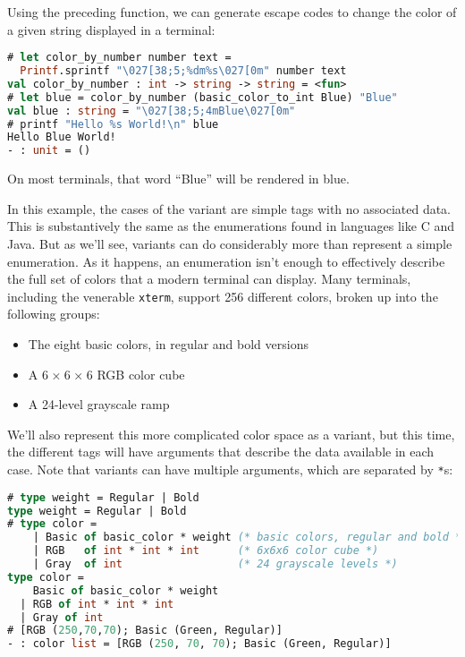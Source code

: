 Using the preceding function, we can generate escape codes to change the
color of a given string displayed in a terminal:

\begin{lstlisting}[language=Caml]
# let color_by_number number text =
  Printf.sprintf "\027[38;5;%dm%s\027[0m" number text
val color_by_number : int -> string -> string = <fun>
# let blue = color_by_number (basic_color_to_int Blue) "Blue"
val blue : string = "\027[38;5;4mBlue\027[0m"
# printf "Hello %s World!\n" blue
Hello Blue World!
- : unit = ()
\end{lstlisting}

On most terminals, that word ``Blue'' will be rendered in blue.

In this example, the cases of the variant are simple tags with no
associated data. This is substantively the same as the enumerations
found in languages like C and Java. But as we'll see, variants can do
considerably more than represent a simple enumeration. As it happens, an
enumeration isn't enough to effectively describe the full set of colors
that a modern terminal can display. Many terminals, including the
venerable \passthrough{\lstinline!xterm!}, support 256 different colors,
broken up into the following groups:

\begin{itemize}
\item
  The eight basic colors, in regular and bold versions
\item
  A 6 × 6 × 6 RGB color cube
\item
  A 24-level grayscale ramp
\end{itemize}

We'll also represent this more complicated color space as a variant, but
this time, the different tags will have arguments that describe the data
available in each case. Note that variants can have multiple arguments,
which are separated by \passthrough{\lstinline!*!}s:

\begin{lstlisting}[language=Caml]
# type weight = Regular | Bold
type weight = Regular | Bold
# type color =
    | Basic of basic_color * weight (* basic colors, regular and bold *)
    | RGB   of int * int * int      (* 6x6x6 color cube *)
    | Gray  of int                  (* 24 grayscale levels *)
type color =
    Basic of basic_color * weight
  | RGB of int * int * int
  | Gray of int
# [RGB (250,70,70); Basic (Green, Regular)]
- : color list = [RGB (250, 70, 70); Basic (Green, Regular)]
\end{lstlisting}

